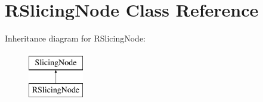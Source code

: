 \hypertarget{class_open_chams_1_1_r_slicing_node}{}\section{R\+Slicing\+Node Class Reference}
\label{class_open_chams_1_1_r_slicing_node}
Inheritance diagram for R\+Slicing\+Node\+:\begin{figure}[H]
\begin{center}
\leavevmode
\includegraphics[height=2.000000cm]{class_open_chams_1_1_r_slicing_node}
\end{center}
\end{figure}
